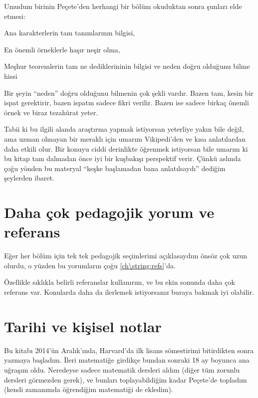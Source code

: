 Umudum birinin Peçete'den herhangi bir bölüm okuduktan sonra 
şunları elde etmesi:
\begin{itemize}
    \ii Ana karakterlerin tam tanımlarının bilgisi,

    \ii En önemli örneklerle haşır neşir olma,

    \ii Meşhur teoremlerin tam ne dediklerininin bilgisi 
    ve neden doğru olduğunu bilme hissi
\end{itemize}
Bir şeyin ``neden'' doğru olduğunu bilmenin çok şekli vardır.
Bazen tam, kesin bir ispat gerektirir, bazen ispatın 
sadece fikri verilir. Bazen ise sadece birkaç 
önemli örnek ve biraz tezahürat yeter.

Tabii ki bu ilgili alanda araştırma yapmak istiyorsan yeterliye 
yakın bile değil, ama uzman olmayan bir meraklı için 
umarım Vikipedi'den ve kısa anlatılardan daha etkili olur. 
Bir konuyu ciddi derinlikte öğrenmek istiyorsan bile
umarım ki bu kitap tam dalmadan önce iyi bir kuşbakışı 
perspektif verir. Çünkü aslında çoğu yönden bu materyal 
``keşke başlamadan bana anlatılsaydı'' dediğim şeylerden 
ibaret.


\section*{Daha çok pedagojik yorum ve referans}
Eğer her bölüm için tek tek pedagojik seçimlerimi
açıklasaydım önsöz çok uzun olurdu, o yüzden bu 
yorumların çoğu \cref{ch\string:refs}'da.

Özellikle sıklıkla belirli referanslar kullanırım, ve 
bu ekin sonunda daha çok referans var. Konularda
daha da ilerlemek istiyorsanız buraya bakmak iyi olabilir.

\section*{Tarihi ve kişisel notlar}
Bu kitabı 2014'ün Aralık'ında, Harvard'da ilk lisans 
sömestirimi bitirdikten sonra yazmaya başladım. 
İleri matematiğe girdikçe bundan sonraki 18 
ay boyunca ana uğraşım oldu.
Neredeyse sadece matematik dersleri aldım (diğer tüm 
zorunlu dersleri görmezden gerek), ve bunları toplayabildiğim kadar 
Peçete'de topladım (kendi zamanımda öğrendiğim matematiği de ekledim). 

